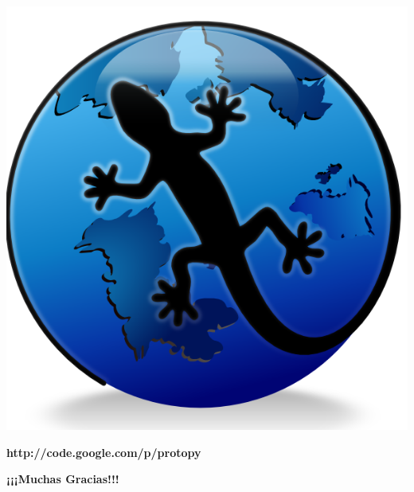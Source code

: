 \documentclass{beamer}
\begin{document}
\begin{frame}
    \begin{center}
        \vfill
        \includegraphics[scale=0.3]{protopy.png}\par
        {\LARGE\bf http://code.google.com/p/protopy}
        \vfill
    \end{center}    
\end{frame}

\begin{frame}
    \vfill
    \begin{center}
        {\Huge\bf ¡¡¡Muchas Gracias!!!}
    \end{center}
    \vfill
\end{frame}
\end{document}
